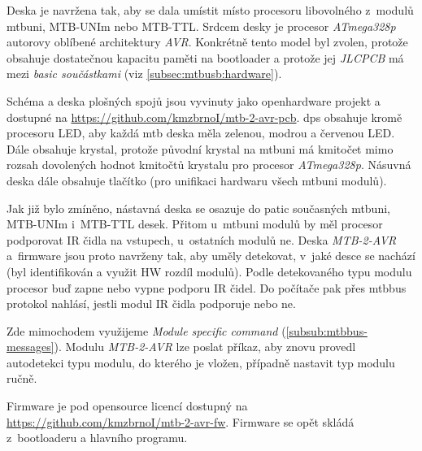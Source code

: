Deska je navržena tak, aby se dala umístit místo procesoru libovolného z~modulů
\gls{mtbuni}, MTB-UNIm nebo MTB-TTL. Srdcem desky je procesor
\textit{ATmega328p} autorovy oblíbené architektury \textit{AVR}.
Konkrétně tento model byl zvolen, protože obsahuje dostatečnou kapacitu paměti
na bootloader a protože jej \textit{JLCPCB} má mezi \textit{basic součástkami}
(viz \ref{subsec:mtbusb:hardware}).

Schéma a deska plošných spojů jsou vyvinuty jako openhardware projekt a dostupné
na \url{https://github.com/kmzbrnoI/mtb-2-avr-pcb}. \gls{dps} obsahuje
kromě procesoru LED, aby každá \gls{mtb} deska měla zelenou, modrou a
červenou LED. Dále obsahuje krystal, protože původní krystal na \gls{mtbuni}
má kmitočet mimo rozsah dovolených hodnot kmitočtů krystalu pro procesor
\textit{ATmega328p}. Násuvná deska dále obsahuje tlačítko (pro unifikaci hardwaru
všech \gls{mtbuni} modulů).

Jak již bylo zmíněno, nástavná deska se osazuje do patic současných
\gls{mtbuni}, MTB-UNIm i~MTB-TTL desek. Přitom u~\gls{mtbuni} modulů by měl
procesor podporovat IR čidla na vstupech, u~ostatních modulů ne. Deska \textit{MTB-2-AVR}
a~firmware jsou proto navrženy tak, aby uměly detekovat, v~jaké desce se
nachází (byl identifikován a využit HW rozdíl modulů). Podle detekovaného typu
modulu procesor buď zapne nebo vypne podporu IR čidel. Do počítače pak přes
\gls{mtbbus} protokol nahlásí, jestli modul IR čidla podporuje nebo ne.

Zde mimochodem využijeme \textit{Module specific command}
(\ref{subsub:mtbbus-messages}). Modulu \textit{MTB-2-AVR} lze poslat příkaz,
aby znovu provedl autodetekci typu modulu, do kterého je vložen, případně
nastavit typ modulu ručně.

Firmware je pod opensource licencí dostupný na
\url{https://github.com/kmzbrnoI/mtb-2-avr-fw}. Firmware se opět skládá
z~bootloaderu a hlavního programu.
